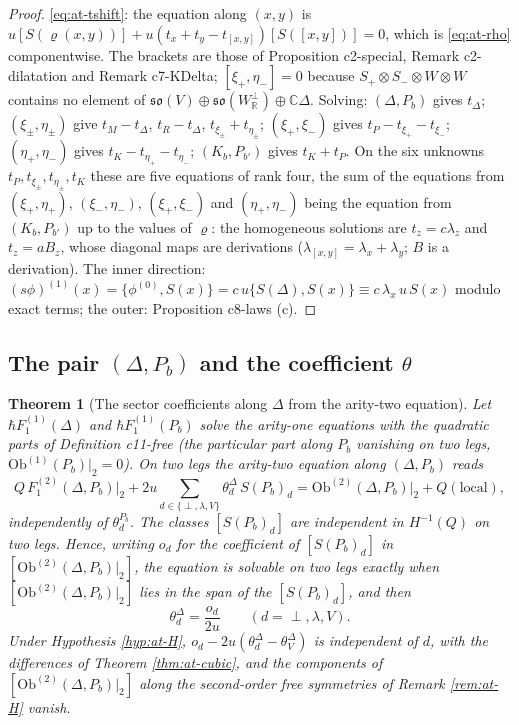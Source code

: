 \documentclass[11pt]{article}
\numberwithin{equation}{section}
\theoremstyle{plain}
\newtheorem{theorem}{Theorem}[section]
\theoremstyle{definition}
\newcommand{\Ob}{\mathrm{Ob}}
\begin{document}
\begin{proof}
\eqref{eq:at-tshift}: the equation along $(x,y)$ is $u[S(\varrho(x,y))]+u(t_x+t_y-t_{[x,y]})[S([x,y])]=0$, which is \eqref{eq:at-rho} componentwise. The brackets are those of Proposition c2-special, Remark c2-dilatation and Remark c7-KDelta; $[\xi_+,\eta_-]=0$ because $S_+\otimes S_-\otimes W\otimes W$ contains no element of $\mathfrak{so}(V)\oplus\mathfrak{so}(W^\perp_{\mathbb R})\oplus\mathbb C\Delta$. Solving: $(\Delta,P_b)$ gives $t_\Delta$; $(\xi_\pm,\eta_\pm)$ give $t_M-t_\Delta$, $t_R-t_\Delta$, $t_{\xi_\pm}+t_{\eta_\pm}$; $(\xi_+,\xi_-)$ gives $t_P-t_{\xi_+}-t_{\xi_-}$; $(\eta_+,\eta_-)$ gives $t_K-t_{\eta_+}-t_{\eta_-}$; $(K_b,P_{b'})$ gives $t_K+t_P$. On the six unknowns $t_P,t_{\xi_\pm},t_{\eta_\pm},t_K$ these are five equations of rank four, the sum of the equations from $(\xi_+,\eta_+)$, $(\xi_-,\eta_-)$, $(\xi_+,\xi_-)$ and $(\eta_+,\eta_-)$ being the equation from $(K_b,P_{b'})$ up to the values of $\varrho$: the homogeneous solutions are $t_z=c\lambda_z$ and $t_z=aB_z$, whose diagonal maps are derivations ($\lambda_{[x,y]}=\lambda_x+\lambda_y$; $B$ is a derivation). The inner direction: $(s\phi)^{(1)}(x)=\{\phi^{(0)},S(x)\}=c\,u\{S(\Delta),S(x)\}\equiv c\,\lambda_x\,u\,S(x)$ modulo exact terms; the outer: Proposition c8-laws (c).
\end{proof}

\subsection{The pair $(\Delta,P_b)$ and the coefficient $\theta$}

\begin{theorem}[The sector coefficients along $\Delta$ from the arity-two equation]
\label{thm:at-theta}
Let $\hbar F_1^{(1)}(\Delta)$ and $\hbar F_1^{(1)}(P_b)$ solve the arity-one equations with the quadratic parts of Definition c11-free (the particular part along $P_b$ vanishing on two legs, $\Ob^{(1)}(P_b)|_2=0$). On two legs the arity-two equation along $(\Delta,P_b)$ reads
\begin{equation}
Q\,F_1^{(2)}(\Delta,P_b)\big|_2+2u\sum_{d\in\{\perp,\lambda,V\}}\theta^\Delta_d\,S(P_b)_d=\Ob^{(2)}(\Delta,P_b)\big|_2+Q(\text{local}),
\label{eq:at-theta}
\end{equation}
independently of $\theta^{P_b}_d$. The classes $[S(P_b)_d]$ are independent in $H^{-1}(Q)$ on two legs. Hence, writing $o_d$ for the coefficient of $[S(P_b)_d]$ in $[\Ob^{(2)}(\Delta,P_b)|_2]$, the equation is solvable on two legs exactly when $[\Ob^{(2)}(\Delta,P_b)|_2]$ lies in the span of the $[S(P_b)_d]$, and then
\[
\theta^\Delta_d=\frac{o_d}{2u}\qquad(d=\perp,\lambda,V).
\]
Under Hypothesis \ref{hyp:at-H}, $o_d-2u(\theta^\Delta_d-\theta^\Delta_V)$ is independent of $d$, with the differences of Theorem \ref{thm:at-cubic}, and the components of $[\Ob^{(2)}(\Delta,P_b)|_2]$ along the second-order free symmetries of Remark \ref{rem:at-H} vanish.
\end{theorem}
\end{document}

